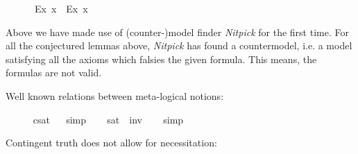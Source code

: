 \begin{isabellebody}
%
\isadelimproof
\ %
\endisadelimproof
%
\isatagproof
{}\isamarkupfalse%
\ %
%
\endisatagproof
{\isafoldproof}%
%
\isadelimproof
%
\endisadelimproof
\isanewline
\ \isamarkupfalse%
\ {\isachardoublequoteopen}{\isasymlfloor}\isactrlbold {\isasymbox}{\isacharparenleft}\isactrlbold {\isasymforall}\isactrlsup Ex{\isachardot}{\isacharparenleft}{\isasymphi}\ x{\isacharparenright}{\isacharparenright}\ \isactrlbold {\isasymrightarrow}\ {\isacharparenleft}\isactrlbold {\isasymforall}\isactrlsup Ex{\isachardot}\isactrlbold {\isasymbox}{\isacharparenleft}{\isasymphi}\ x{\isacharparenright}{\isacharparenright}{\isasymrfloor}{\isachardoublequoteclose}\ \isamarkupfalse%
%
\isadelimproof
\ %
\endisadelimproof
%
\isatagproof
{}\isamarkupfalse%
\ %
%
\endisatagproof
{\isafoldproof}%
%
\isadelimproof
%
\endisadelimproof
%
\begin{isamarkuptext}%
Above we have made use of (counter-)model finder \emph{Nitpick} \cite{Nitpick} for the first time.  
For all the conjectured lemmas above, \emph{Nitpick} has found a countermodel, i.e. a model satisfying all 
the axioms which falsies the given formula. This means, the formulas are not valid.%
\end{isamarkuptext}\isamarkuptrue%
%
\begin{isamarkuptext}%
Well known relations between meta-logical notions:%
\end{isamarkuptext}\isamarkuptrue%
\ \isamarkupfalse%
\ \ {\isachardoublequoteopen}{\isasymlfloor}{\isasymphi}{\isasymrfloor}\ {\isasymlongleftrightarrow}\ {\isasymnot}{\isasymlfloor}{\isasymphi}{\isasymrfloor}\isactrlsup c\isactrlsup s\isactrlsup a\isactrlsup t{\isachardoublequoteclose}%
\isadelimproof
\ %
\endisadelimproof
%
\isatagproof
{}\isamarkupfalse%
\ simp%
\endisatagproof
{\isafoldproof}%
%
\isadelimproof
%
\endisadelimproof
\isanewline
\ \isamarkupfalse%
\ \ {\isachardoublequoteopen}{\isasymlfloor}{\isasymphi}{\isasymrfloor}\isactrlsup s\isactrlsup a\isactrlsup t\ {\isasymlongleftrightarrow}\ {\isasymnot}{\isasymlfloor}{\isasymphi}{\isasymrfloor}\isactrlsup i\isactrlsup n\isactrlsup v\ {\isachardoublequoteclose}%
\isadelimproof
\ %
\endisadelimproof
%
\isatagproof
{}\isamarkupfalse%
\ simp%
\endisatagproof
{\isafoldproof}%
%
\isadelimproof
%
\endisadelimproof
%
\begin{isamarkuptext}%
Contingent truth does not allow for necessitation:%

\end{isamarkuptext}
\end{isabellebody}
